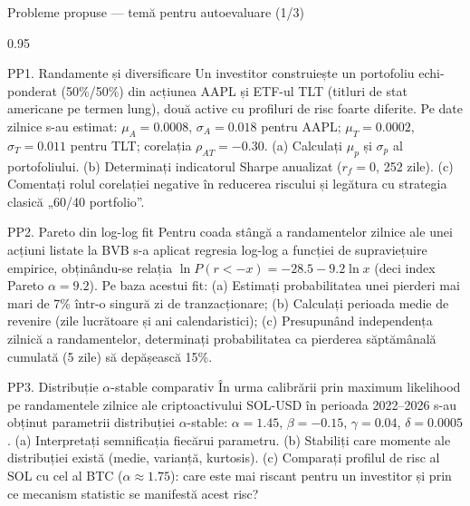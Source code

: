 \documentclass[9pt, aspectratio=169, t]{beamer}
\begin{document}
\begin{frame}[shrink=22]{Probleme propuse --- temă pentru autoevaluare (1/3)}
\begin{cminipage}{0.95\textwidth}
\begin{block}{PP1. Randamente și diversificare}
Un investitor construiește un portofoliu echi-ponderat (50\%/50\%) din acțiunea AAPL și ETF-ul TLT (titluri de stat americane pe termen lung), două active cu profiluri de risc foarte diferite. Pe date zilnice s-au estimat: $\mu_A=0.0008$, $\sigma_A=0.018$ pentru AAPL; $\mu_T=0.0002$, $\sigma_T=0.011$ pentru TLT; corelația $\rho_{AT}=-0.30$. (a) Calculați $\mu_p$ și $\sigma_p$ al portofoliului. (b) Determinați indicatorul Sharpe anualizat ($r_f=0$, 252 zile). (c) Comentați rolul corelației negative în reducerea riscului și legătura cu strategia clasică „60/40 portfolio''.
\end{block}
\begin{block}{PP2. Pareto din log-log fit}
Pentru coada stângă a randamentelor zilnice ale unei acțiuni listate la BVB s-a aplicat regresia log-log a funcției de supraviețuire empirice, obținându-se relația $\ln P(r<-x) = -28.5 - 9.2\ln x$ (deci index Pareto $\alpha=9.2$). Pe baza acestui fit: (a) Estimați probabilitatea unei pierderi mai mari de 7\% într-o singură zi de tranzacționare; (b) Calculați perioada medie de revenire (zile lucrătoare și ani calendaristici); (c) Presupunând independența zilnică a randamentelor, determinați probabilitatea ca pierderea săptămânală cumulată (5 zile) să depășească 15\%.
\end{block}
\begin{block}{PP3. Distribuție $\alpha$-stable comparativ}
În urma calibrării prin maximum likelihood pe randamentele zilnice ale criptoactivului SOL-USD în perioada 2022--2026 s-au obținut parametrii distribuției $\alpha$-stable: $\alpha=1.45$, $\beta=-0.15$, $\gamma=0.04$, $\delta=0.0005$. (a) Interpretați semnificația fiecărui parametru. (b) Stabiliți care momente ale distribuției există (medie, varianță, kurtosis). (c) Comparați profilul de risc al SOL cu cel al BTC ($\alpha\approx 1.75$): care este mai riscant pentru un investitor și prin ce mecanism statistic se manifestă acest risc?
\end{block}
\end{cminipage}
\end{frame}
\end{document}
